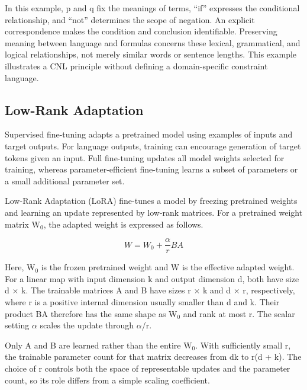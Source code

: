 \documentclass[nolineno]{ieeeaccess}
\begin{document}
In this example, p and q fix the meanings of terms, “if” expresses the conditional relationship, and “not” determines the scope of negation. An explicit correspondence makes the condition and conclusion identifiable. Preserving meaning between language and formulas concerns these lexical, grammatical, and logical relationships, not merely similar words or sentence lengths. This example illustrates a CNL principle without defining a domain-specific constraint language.\par

\subsection{Low-Rank Adaptation}

Supervised fine-tuning adapts a pretrained model using examples of inputs and target outputs. For language outputs, training can encourage generation of target tokens given an input. Full fine-tuning updates all model weights selected for training, whereas parameter-efficient fine-tuning learns a subset of parameters or a small additional parameter set.\par

Low-Rank Adaptation (LoRA) fine-tunes a model by freezing pretrained weights and learning an update represented by low-rank matrices. For a pretrained weight matrix W\ensuremath{_0}, the adapted weight is expressed as follows. \cite{r14}\par

\[W=W_0+\frac{\alpha}{r}BA\]

Here, W\ensuremath{_0} is the frozen pretrained weight and W is the effective adapted weight. For a linear map with input dimension k and output dimension d, both have size d \ensuremath{\times} k. The trainable matrices A and B have sizes r \ensuremath{\times} k and d \ensuremath{\times} r, respectively, where r is a positive internal dimension usually smaller than d and k. Their product BA therefore has the same shape as W\ensuremath{_0} and rank at most r. The scalar setting \ensuremath{\alpha} scales the update through \ensuremath{\alpha}/r. \cite{r14}\par

Only A and B are learned rather than the entire W\ensuremath{_0}. With sufficiently small r, the trainable parameter count for that matrix decreases from dk to r(d + k). The choice of r controls both the space of representable updates and the parameter count, so its role differs from a simple scaling coefficient.\par
\end{document}
